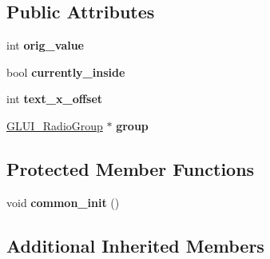 \subsection*{Public Attributes}
\begin{DoxyCompactItemize}
\item 
\hypertarget{classGLUI__RadioButton_aa874a5e29d93e5e65befd745d0e16454}{int {\bfseries orig\-\_\-value}}\label{classGLUI__RadioButton_aa874a5e29d93e5e65befd745d0e16454}

\item 
\hypertarget{classGLUI__RadioButton_ae4bcf4b331712a2dc21f944e00071cf6}{bool {\bfseries currently\-\_\-inside}}\label{classGLUI__RadioButton_ae4bcf4b331712a2dc21f944e00071cf6}

\item 
\hypertarget{classGLUI__RadioButton_a857d2387855fca92f0ae322e3f6fc19a}{int {\bfseries text\-\_\-x\-\_\-offset}}\label{classGLUI__RadioButton_a857d2387855fca92f0ae322e3f6fc19a}

\item 
\hypertarget{classGLUI__RadioButton_ab9906e39403d7b15810384a59e99e054}{\hyperlink{classGLUI__RadioGroup}{G\-L\-U\-I\-\_\-\-Radio\-Group} $\ast$ {\bfseries group}}\label{classGLUI__RadioButton_ab9906e39403d7b15810384a59e99e054}

\end{DoxyCompactItemize}
\subsection*{Protected Member Functions}
\begin{DoxyCompactItemize}
\item 
\hypertarget{classGLUI__RadioButton_aba1127e895ee062d421b8e6cd6f4bb48}{void {\bfseries common\-\_\-init} ()}\label{classGLUI__RadioButton_aba1127e895ee062d421b8e6cd6f4bb48}

\end{DoxyCompactItemize}
\subsection*{Additional Inherited Members}


